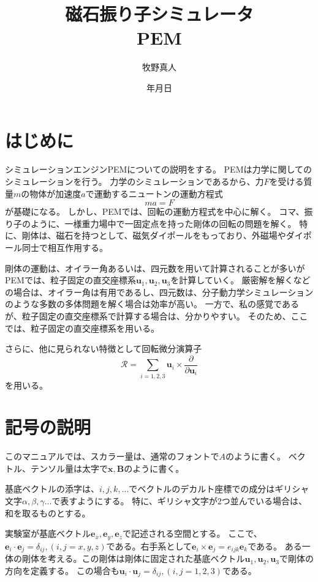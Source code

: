 \documentclass[a4paper,11pt]{jbook}
\title{磁石振り子シミュレータ\\PEM}
\author{牧野真人}
\date{\number\year 年\number\month 月\number\day 日}
\def\vecR {\bm {\mathcal {R} } }
\begin{document}
\maketitle
\tableofcontents 
\chapter{はじめに}
シミュレーションエンジンPEMについての説明をする。
PEMは力学に関してのシミュレーションを行う。
力学のシミュレーションであるから、力$F$を受ける質量$m$の物体が加速度$a$で運動するニュートンの運動方程式
\begin{equation}
ma=F
\end{equation}
が基礎になる。
しかし、PEMでは、回転の運動方程式を中心に解く。
コマ、振り子のように、一様重力場中で一固定点を持った剛体の回転の問題を解く。
特に、剛体は、磁石を持つとして、磁気ダイポールをもっており、外磁場やダイポール同士で相互作用する。

剛体の運動は、オイラー角あるいは、四元数を用いて計算されることが多いがPEMでは、粒子固定の直交座標系$\bm{u}_1,\bm{u}_2,\bm{u}_3$を計算していく。
厳密解を解くなどの場合は、オイラー角は有用であるし、四元数は、分子動力学シミュレーションのような多数の多体問題を解く場合は効率が高い。
一方で、私の感覚であるが、粒子固定の直交座標系で計算する場合は、分かりやすい。
そのため、ここでは、粒子固定の直交座標系を用いる。

さらに、他に見られない特徴として回転微分演算子
\begin{equation}
\vecR =\sum_{i=1,2,3}\bm{u}_i\times\frac{\partial}{\partial \bm{u}_i}
\end{equation}
を用いる。
\chapter{記号の説明}
このマニュアルでは、スカラー量は、通常のフォントで$A$のように書く。
ベクトル、テンソル量は太字で$\bm{x},\bm{B}$のように書く。

基底ベクトルの添字は、$i,j,k,...$でベクトルのデカルト座標での成分はギリシャ文字$\alpha, \beta,\gamma ...$で表すようにする。
特に、ギリシャ文字が2つ並んでいる場合は、和を取るものとする。

実験室が基底ベクトル$\bm{e}_x, \bm{e}_y,\bm{e}_z $で記述される空間とする。
ここで、$\bm{e}_i\cdot\bm{e}_j=\delta_{ij}, (i,j=x,y,z)$である。右手系として$\bm{e}_i\times\bm{e}_j=e_{ijk}\bm{e}_k$である。
ある一体の剛体を考える。この剛体は剛体に固定された基底ベクトル$\bm{u}_1,\bm{u}_2,\bm{u}_3$で剛体の方向を定義する。
この場合も$\bm{u}_i\cdot\bm{u}_j=\delta_{ij}, (i,j=1,2,3)$である。
\end{document}
